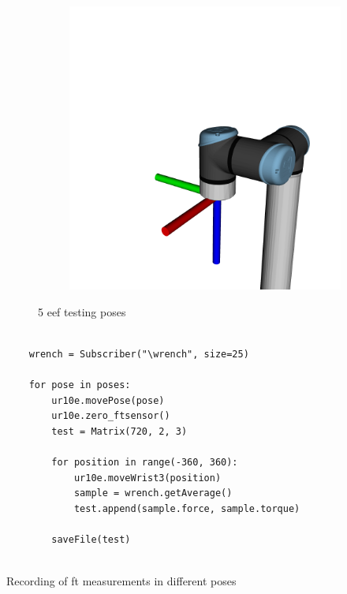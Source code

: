 \begin{figure}[h]
\begin{subfigure}{.2\linewidth}
        \label{fig:eef_p4}
    \end{subfigure}%
    \begin{subfigure}{.2\linewidth}
        \centering
        \includegraphics[width=\linewidth]{figs/chp3/P5.png}
        \label{fig:eef_p5}
    \end{subfigure}
    \caption{5 \ac{eef} testing poses}
    \label{fig:eef_5_position}
\end{figure}

\begin{listing}[h]
    \centering
    \begin{verbatim}

    wrench = Subscriber("\wrench", size=25)
    
    for pose in poses:
        ur10e.movePose(pose)
        ur10e.zero_ftsensor()
        test = Matrix(720, 2, 3)

        for position in range(-360, 360):
            ur10e.moveWrist3(position)
            sample = wrench.getAverage()
            test.append(sample.force, sample.torque)
        
        saveFile(test)   
    
    \end{verbatim}
\caption{Recording of \ac{ft} measurements in different poses}
\label{code:w3_test}
\end{listing}

